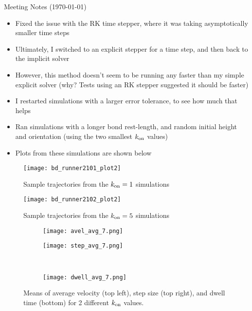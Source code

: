\documentclass{article}
\newcommand{\tn}{\textnormal}
\begin{document}
\pagestyle{plain}

\begin{center}
  {\Large Meeting Notes (\today)}
\end{center}

\begin{itemize}
\item Fixed the issue with the RK time stepper, where it was taking
  asymptotically smaller time steps
\item Ultimately, I switched to an explicit stepper for a time step,
  and then back to the implicit solver
\item However, this method doesn't seem to be running any faster than
  my simple explicit solver (why? Tests using an RK stepper suggested
  it should be faster)
\item I restarted simulations with a larger error tolerance, to see
  how much that helps
\item Ran simulations with a longer bond rest-length, and random
  initial height and orientation (using the two smallest $k_\tn{on}$
  values)
\item Plots from these simulations are shown below
\end{itemize}


\begin{figure}[h]
  \centering
  \texttt{[image: bd\_runner2101\_plot2]}
  \caption{Sample trajectories from the $k_\tn{on} = 1$ simulations}
  \label{fig:k1-traj}
\end{figure}

\begin{figure}[h]
  \centering
  \texttt{[image: bd\_runner2102\_plot2]}
  \caption{Sample trajectories from the $k_\tn{on} = 5$ simulations}
  \label{fig:k5-traj}
\end{figure}

\begin{figure}[h]
  \centering
  \begin{subfigure}{0.49\textwidth}
    \texttt{[image: avel\_avg\_7.png]}
  \end{subfigure}
  \hfill
  \begin{subfigure}{0.49\textwidth}
    \texttt{[image: step\_avg\_7.png]}
  \end{subfigure}
  \\
  \begin{subfigure}{0.49\textwidth}
    \texttt{[image: dwell\_avg\_7.png]}
  \end{subfigure}
  \label{fig:stats}
  \caption{Means of average velocity (top left), step size (top
    right), and dwell time (bottom) for 2 different $k_\tn{on}$
    values.}
\end{figure}

% 
% 
\end{document}
